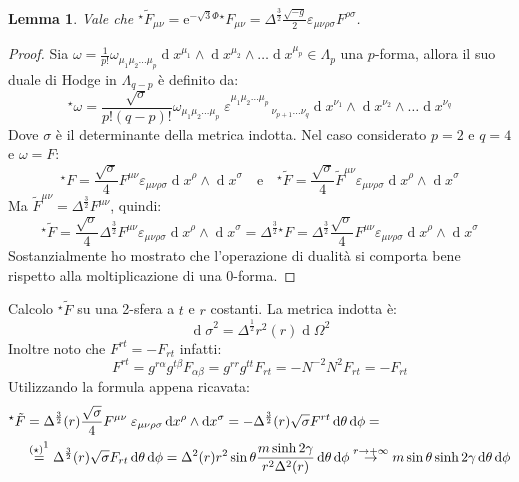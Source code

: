 \documentclass[]{scrartcl}
\newtheorem{lemma}{Lemma}
\newcommand{\me}{\mathrm{e}}
\newcommand{\sg}{\sqrt{-g}}
\renewcommand{\d}[1]{\ensuremath{\operatorname{d}\!{#1}}}
\newcommand{\hF}{{}^\star F}
\newcommand{\htF}{{}^\star \tilde{F}}
\begin{document}
\begin{lemma}
  Vale che  $ \htF_{\mu\nu} = \me^{-\sqrt{3}\Phi} \hF_{\mu\nu} = \Delta^{\frac{3}{2}}\frac{\sg}{2} \varepsilon_{\mu\nu\rho\sigma} F^{\rho\sigma}$.
\end{lemma}

\begin{proof}
  Sia $ \omega = \frac{1}{p!} \omega_{\mu_1\mu_2\dots\mu_p} \d x^{\mu_1} \wedge \d x^{\mu_2} \wedge \dots \d x^{\mu_p} \in \Lambda_p $ una $ p $-forma,
  allora il suo duale di Hodge in $ \Lambda_{q-p} $ è definito da:
  \[
    {}^\star \omega =  \frac{\sqrt{\sigma}}{p!(q-p)!} \omega_{\mu_1\mu_2\dots\mu_p} \; \varepsilon^{\mu_1\mu_2\dots\mu_p}_{\;\;\;\;\;\;\;\;\;\;\;\;\;\;\;\nu_{p+1}\dots\nu_{q}}
    \d x^{\nu_1} \wedge \d x^{\nu_2} \wedge \dots \d x^{\nu_q}
  \]
  Dove $ \sigma $ è il determinante della metrica indotta.
  Nel caso considerato $ p = 2 $ e $ q = 4 $ e $ \omega = F $:
  \[
    \hF = \frac{\sqrt{\sigma}}{4} F^{\mu\nu}\varepsilon_{\mu\nu\rho\sigma} \d x^\rho \wedge \d x^\sigma \quad \text{e} \quad
    \htF = \frac{\sqrt{\sigma}}{4} \tilde{F}^{\mu\nu}\varepsilon_{\mu\nu\rho\sigma} \d x^\rho \wedge \d x^\sigma
  \]
  Ma $ \tilde{F}^{\mu\nu} = \Delta^{\frac{3}{2}} F^{\mu\nu} $, quindi:
  \[
    \htF = \frac{\sqrt{\sigma}}{4} \Delta^{\frac{3}{2}}F^{\mu\nu}\varepsilon_{\mu\nu\rho\sigma} \d x^\rho \wedge \d x^\sigma = \Delta^{\frac{3}{2}} \hF
    = \Delta^{\frac{3}{2}} \frac{\sqrt{\sigma}}{4} F^{\mu\nu}\varepsilon_{\mu\nu\rho\sigma} \d x^\rho \wedge \d x^\sigma
  \]
  Sostanzialmente ho mostrato che l'operazione di dualità si comporta bene rispetto alla moltiplicazione di una 0-forma.
\end{proof}
\noindent
Calcolo $ \htF $ su una 2-sfera a $ t $ e $ r $ costanti. La metrica indotta è:
\[
  \d \sigma^2 = \Delta^{\frac{1}{2}}r^2(r) \d \Omega^2
\]
Inoltre noto che $ F^{rt} = - F_{rt} $ infatti:
\[
  F^{rt} = g^{r\alpha}g^{t\beta}F_{\alpha\beta} = g^{rr}g^{tt}F_{rt} = -N^{-2}N^2 F_{rt} = - F_{rt}
\]
Utilizzando la formula appena ricavata:
\begin{align*}
  \htF & = \Delta^{\frac{3}{2}}(r) \frac{\sqrt{\sigma}}{4} F^{\mu\nu}\;\varepsilon_{\mu\nu\rho\sigma} \d x^\rho \wedge \d x^\sigma
        = -\Delta^{\frac{3}{2}}(r) \sqrt{\sigma} F^{rt}  \d \theta \d \phi = \\
       & \overset{(\star)\footnotemark[1]}{=}
         \Delta^{\frac{3}{2}}(r) \sqrt{\sigma} F_{rt} \d \theta \d \phi
        = \Delta^{2}(r) {r^2} \sin\theta  \frac{m \sinh 2\gamma}{r^2 \Delta^2(r)} \d \theta \d \phi
        \overset{r\to +\infty}{\to} {m \sin\theta \sinh 2\gamma} \d \theta \d \phi
\end{align*}%
\end{document}
